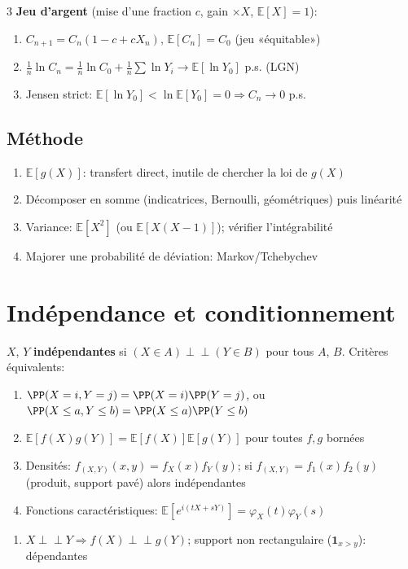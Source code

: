 \documentclass[12pt, a4paper]{article}
\newcommand{\E}{\mathbb{E}}
\newcommand{\ind}{\mathbf{1}}
\begin{document}
\begin{multicols*}{3}
	\textbf{Jeu d'argent} (mise d'une fraction $c$, gain $\times X$, $\E[X]=1$):
	\begin{enumerate}[\roman*.]
		\item $C_{n+1}=C_n(1-c+cX_n)$, $\E[C_n]=C_0$ (jeu «équitable»)
		\item $\frac1n\ln C_n=\frac1n\ln C_0+\frac1n\sum\ln Y_i\to\E[\ln Y_0]$ p.s. (LGN)
		\item Jensen strict: $\E[\ln Y_0]<\ln\E[Y_0]=0\Rightarrow C_n\to0$ p.s.
	\end{enumerate}

	\subsection{Méthode}
	\begin{enumerate}[\roman*.]
		\item $\E[g(X)]$: transfert direct, inutile de chercher la loi de $g(X)$
		\item Décomposer en somme (indicatrices, Bernoulli, géométriques) puis linéarité
		\item Variance: $\E[X^2]$ (ou $\E[X(X-1)]$); vérifier l'intégrabilité
		\item Majorer une probabilité de déviation: Markov/Tchebychev
	\end{enumerate}

	\colbreak
	\section{Indépendance et conditionnement}
	$X$, $Y$ \textbf{indépendantes} si $(X\in A)\perp\!\!\!\perp(Y\in B)$ pour tous $A$, $B$. Critères équivalents:
	\begin{enumerate}[\roman*.]
		\item $\PP(X=i,Y=j)=\PP(X=i)\PP(Y=j)$, ou $\PP(X\leq a,Y\leq b)=\PP(X\leq a)\PP(Y\leq b)$
		\item $\E[f(X)g(Y)]=\E[f(X)]\E[g(Y)]$ pour toutes $f,g$ bornées
		\item Densités: $f_{(X,Y)}(x,y)=f_X(x)f_Y(y)$; si $f_{(X,Y)}=f_1(x)f_2(y)$ (produit, support pavé) alors indépendantes
		\item Fonctions caractéristiques: $\E[e^{i(tX+sY)}]=\varphi_X(t)\varphi_Y(s)$
	\end{enumerate}
	\begin{enumerate}[\roman*.]
		\item $X\perp\!\!\!\perp Y\Rightarrow f(X)\perp\!\!\!\perp g(Y)$; support non rectangulaire ($\ind_{x>y}$): dépendantes
	\end{enumerate}


\end{multicols*}
\end{document}
